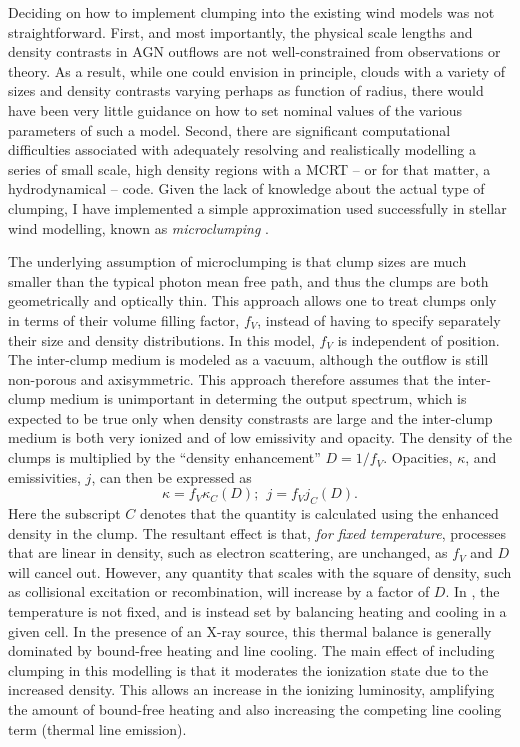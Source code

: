 Deciding on how to implement clumping into the existing wind models was not straightforward.
First, and most importantly, the physical scale lengths and density contrasts in AGN outflows are not well-constrained from observations or theory.  As a result, while one could envision in principle, clouds with a variety of sizes and density contrasts varying perhaps as function of radius, there would have been very little guidance on how to set nominal values of the various parameters of such a model.
Second, there are significant computational difficulties associated with adequately resolving and realistically modelling a series of small scale, high density regions with a MCRT
-- or for that matter, a hydrodynamical -- code. 
Given the lack of knowledge about the actual type of clumping, I have implemented
a simple approximation used successfully in stellar wind modelling, known as 
{\em microclumping} \citep[e.g.][]{hamann1998,hilliermiller1999,hamann2008}.

The underlying assumption of microclumping is that clump sizes 
are much smaller than the 
typical photon mean free path, and thus the clumps are 
both geometrically and optically thin. This approach 
allows one to treat clumps only in terms of their volume filling factor, $f_V$, 
instead of having to specify separately their size and density distributions.
In this model, $f_V$ is independent of position. 
The inter-clump medium is modeled as a vacuum,
although the outflow is still non-porous and axisymmetric.
This approach therefore assumes that the inter-clump medium
is unimportant in determing the output spectrum, which
is expected to be true only when density constrasts are large and
the inter-clump medium is both very ionized and of low emissivity and opacity.
The density of the clumps is multiplied by the ``density enhancement'' 
$D=1/f_V$. Opacities, $\kappa$, and emissivities, $j$, 
can then be expressed as 
\begin{equation}
\kappa = f_V \kappa_C(D);~~j = f_V j_C(D).
\end{equation}
Here the subscript $C$ denotes that the quantity is calculated using the 
enhanced density in the clump. The resultant effect is that, {\em for fixed temperature},
processes that are linear in density, such as electron scattering, are unchanged, 
as $f_V$ and $D$ will cancel out. However, any quantity that scales with the square of density, 
such as collisional excitation or recombination, will increase by a factor of $D$.
In \py, the temperature is not fixed, and is instead set by balancing heating and 
cooling in a given cell. In the presence of an X-ray source, this thermal balance is 
generally dominated by bound-free heating and line cooling. The main effect of including 
clumping in this modelling is that it moderates the ionization state due to the increased 
density. This allows an increase in the ionizing luminosity, amplifying the amount of
bound-free heating and also increasing the competing line cooling term
(thermal line emission).

